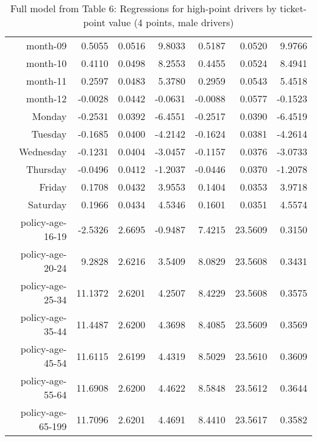 \documentclass[10pt]{article}
\begin{document}
\begin{table}[ht]
\begin{tabular}{rrrrrrr}
  month-09 & 0.5055 & 0.0516 & 9.8033 & 0.5187 & 0.0520 & 9.9766 \\ 
  month-10 & 0.4110 & 0.0498 & 8.2553 & 0.4455 & 0.0524 & 8.4941 \\ 
  month-11 & 0.2597 & 0.0483 & 5.3780 & 0.2959 & 0.0543 & 5.4518 \\ 
  month-12 & -0.0028 & 0.0442 & -0.0631 & -0.0088 & 0.0577 & -0.1523 \\ 
  Monday & -0.2531 & 0.0392 & -6.4551 & -0.2517 & 0.0390 & -6.4519 \\ 
  Tuesday & -0.1685 & 0.0400 & -4.2142 & -0.1624 & 0.0381 & -4.2614 \\ 
  Wednesday & -0.1231 & 0.0404 & -3.0457 & -0.1157 & 0.0376 & -3.0733 \\ 
  Thursday & -0.0496 & 0.0412 & -1.2037 & -0.0446 & 0.0370 & -1.2078 \\ 
  Friday & 0.1708 & 0.0432 & 3.9553 & 0.1404 & 0.0353 & 3.9718 \\ 
  Saturday & 0.1966 & 0.0434 & 4.5346 & 0.1601 & 0.0351 & 4.5574 \\ 
  policy-age-16-19 & -2.5326 & 2.6695 & -0.9487 & 7.4215 & 23.5609 & 0.3150 \\ 
  policy-age-20-24 & 9.2828 & 2.6216 & 3.5409 & 8.0829 & 23.5608 & 0.3431 \\ 
  policy-age-25-34 & 11.1372 & 2.6201 & 4.2507 & 8.4229 & 23.5608 & 0.3575 \\ 
  policy-age-35-44 & 11.4487 & 2.6200 & 4.3698 & 8.4085 & 23.5609 & 0.3569 \\ 
  policy-age-45-54 & 11.6115 & 2.6199 & 4.4319 & 8.5029 & 23.5610 & 0.3609 \\ 
  policy-age-55-64 & 11.6908 & 2.6200 & 4.4622 & 8.5848 & 23.5612 & 0.3644 \\ 
  policy-age-65-199 & 11.7096 & 2.6201 & 4.4691 & 8.4410 & 23.5617 & 0.3582 \\ 
   \hline
\end{tabular}
\caption{Full model from Table 6: Regressions for high-point drivers by ticket-point value (4 points, male drivers)} 
\label{tab_6_4_pts_M}
\end{table}


\clearpage
\pagebreak



\end{document}
